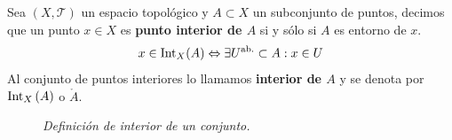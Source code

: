 \begin{defi}
Sea $(X,\mathcal{T})$ un espacio topológico y $A \subset X$ un subconjunto de puntos, decimos que un punto $x\in X$ es \textbf{punto interior de $A$} si y sólo si $A$ es entorno de $x$.
$$
x\in \operatorname{Int}_X(A) \Leftrightarrow \exists U^{\text{ab.}} \subset A : x \in U
$$
Al conjunto de puntos interiores lo llamamos \textbf{interior de $A$} y se denota por $\operatorname{Int}_X \left( A \right)$ o $\mathring{A}$.
\end{defi}

\begin{figure}[H]
    \centering
    \caption{\textit{Definición de interior de un conjunto.}}
    \label{fig:definición-interior}
\end{figure}

